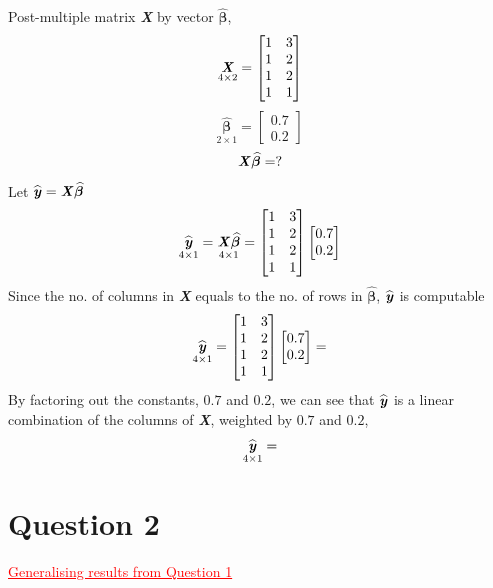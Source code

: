 \documentclass[12pt]{report}
\begin{document}
\justify
Post-multiple matrix \textbf{\textit{X}} by vector $\widehat{\boldsymbol{\beta}}$,
{$$\underset{4\times2}{\textbf{\textit{X}}}
	=
	\begin{bmatrix}
	1 & 3 \\
	1 & 2 \\
	1 & 2 \\
	1 & 1 
	\end{bmatrix}
$$}
{$$\underset{2\times1}{\widehat{\boldsymbol{\beta}}}
	=
	\begin{bmatrix}
	0.7 \\
	0.2 
	\end{bmatrix}
$$}
{$${\textbf{\textit{X}}\widehat{\boldsymbol{\beta}}}
	=
	?
$$}
\justify 
Let $\widehat{\textbf{\textit{y}}}=\textbf{\textit{X}}\widehat{\boldsymbol{\beta}}$
{$$\underset{4\times1}{\widehat{\textbf{\textit{y}}}}
	=
	\underset{4\times1}{\textbf{\textit{X}}\widehat{\boldsymbol{\beta}}}
	=
	\begin{bmatrix}
	1 & 3 \\
	1 & 2 \\
	1 & 2 \\
	1 & 1 
	\end{bmatrix}
	\begin{bmatrix}
	0.7 \\
	0.2 
	\end{bmatrix}
$$}
\justify 
Since the no. of columns in \textbf{\textit{X}} equals to the no. of rows in $\widehat{\boldsymbol{\beta}}$, $\widehat{\textbf{\textit{y}}}$ is computable
{$$\underset{4\times1}{\widehat{\textbf{\textit{y}}}}
	=
	\begin{bmatrix}
	1 & 3 \\
	1 & 2 \\
	1 & 2 \\
	1 & 1 
	\end{bmatrix}
	\begin{bmatrix}
	0.7 \\
	0.2 
	\end{bmatrix}
	=
$$}
\justify
By factoring out the constants, $0.7$ and $0.2$, we can see that $\widehat{\textbf{\textit{y}}}$ is a linear combination of the columns of \textbf{\textit{X}}, weighted by $0.7$ and $0.2$,
{$$\underset{4\times1}{\widehat{\textbf{\textit{y}}}}
	=	
$$}

\newpage
\section*{Question 2}
\textcolor{red}{\underline{Generalising results from Question 1}}
\end{document}

